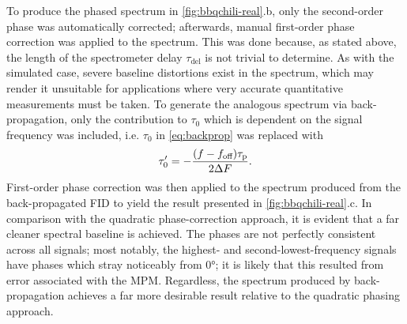 To produce the phased spectrum in \cref{fig:bbqchili-real}.b, only the
second-order phase was automatically corrected; afterwards, manual
first-order phase correction was applied to the spectrum. This was done
because, as stated above, the
length of the spectrometer delay $\tau_{\text{del}}$ is not trivial to
determine. As with the simulated case, severe baseline distortions exist in the
spectrum, which may render it unsuitable for applications where very accurate
quantitative measurements must be taken.
To generate the analogous spectrum via back-propagation, only the
contribution to $\tau_0$ which is dependent on the signal frequency was
included, i.e. $\tau_0$ in \cref{eq:backprop} was replaced with
\begin{equation}
    \tau_{0}^{\prime} = -\frac{(f - f_{\text{off}}) \tau_{\text{p}}}{2 \Delta F}.
\end{equation}
First-order phase correction was then applied to the spectrum produced from the
back-propagated \ac{FID} to yield the result presented in
\cref{fig:bbqchili-real}.c.
In comparison with the quadratic phase-correction approach, it is evident that
a far cleaner spectral baseline is achieved. The phases are not perfectly
consistent across all signals; most notably, the highest- and
second-lowest-frequency signals have phases which stray noticeably from
\ang{0}; it is likely that this resulted from error associated with the
\ac{MPM}. Regardless, the spectrum produced by back-propagation achieves a far
more desirable result relative to the quadratic phasing approach.

